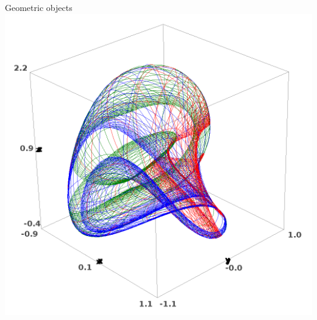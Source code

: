 \documentclass{beamer}
\newcommand{\fr}[1]{}
\newcommand{\en}[1]{#1}
\begin{document}
\begin{frame}{\fr{Objets géométriques}\en{Geometric objects}}
{    \includegraphics[height=.45\textheight]{Pictures/manifold.png}}
\end{frame}
\end{document}
